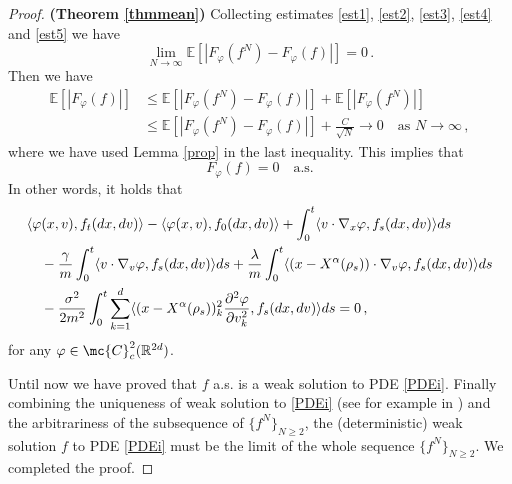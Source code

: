 \documentclass{ims9x6}
\newcommand{\nn}{\nonumber}
\newcommand{\EE}{\mathbb{E}}
\newcommand{\RR}{\mathbb{R}}
\newcommand{\la}{\langle}
\newcommand{\ra}{\rangle}
\begin{document}
\begin{proof}{\textbf{(Theorem \ref{thmmean})}}
	Collecting estimates \eqref{est1}, \eqref{est2}, \eqref{est3}, \eqref{est4} and \eqref{est5} we have
	\begin{equation}
	\lim_{N\rightarrow \infty}\EE[|F_{\varphi}(f^N) -F_{\varphi}(f)|]=0 \,.
	\end{equation}
	Then we have
	\begin{align*}
	\EE[|F_{\varphi}(f)|]&\leq \EE[|F_{\varphi}(f^N) -F_{\varphi}(f)|]+\EE[|F_{\varphi}(f^N)|]\nn\\
	&\leq \EE[|F_{\varphi}(f^N) -F_{\varphi}(f)|]+\frac{C}{\sqrt{N}}\to 0\quad \mbox{as }N\to\infty\,,
	\end{align*}
	where we have used Lemma \ref{prop} in the last inequality.
	This implies that
	\begin{equation}
	F_{\varphi}(f)=0\quad \text{a.s.}
	\end{equation}
	In other words, it holds that
{\small 	\begin{align*}
	&\la \varphi(x,v) ,f_t (dx,dv)\ra-\la \varphi(x,v),f_0(dx,dv) \ra +\int_0^t\la v\cdot\nabla_x\varphi,f_s(dx,dv)\ra ds
	\nn\\
	&\quad-\frac{\gamma}{m}\int_0^t\la v\cdot\nabla_v\varphi,f_s(dx,dv)\ra ds+\frac{\lambda}{m}\int_0^t\la (x-X^\alpha(\rho_s))\cdot \nabla_v\varphi, f_s (dx,dv)\ra ds\notag\\
	&\quad-\frac{\sigma^2}{2m^2}\int_0^t\sum_{k=1}^{d}\la (x-X^\alpha(\rho_s))_k^2\frac{\partial^2\varphi}{\partial v_k^2},f_s (dx,dv)\ra ds=0\,,
	\end{align*}}
	for any $\varphi\in \mc{C}_c^2(\RR^{2d})$. 
	
	Until now we have proved that $f$ a.s. is a weak solution to PDE \eqref{PDEi}. Finally combining the uniqueness of weak solution to \eqref{PDEi}  (see for example in \cite{BCC}) and the arbitrariness of the subsequence of $\{f^N\}_{N\geq 2}$,  the (deterministic) weak solution $f$ to PDE \eqref{PDEi} must be the limit of the whole sequence $\{f^N\}_{N\geq 2}$. We completed the proof.
	\end{proof}
\end{document}
